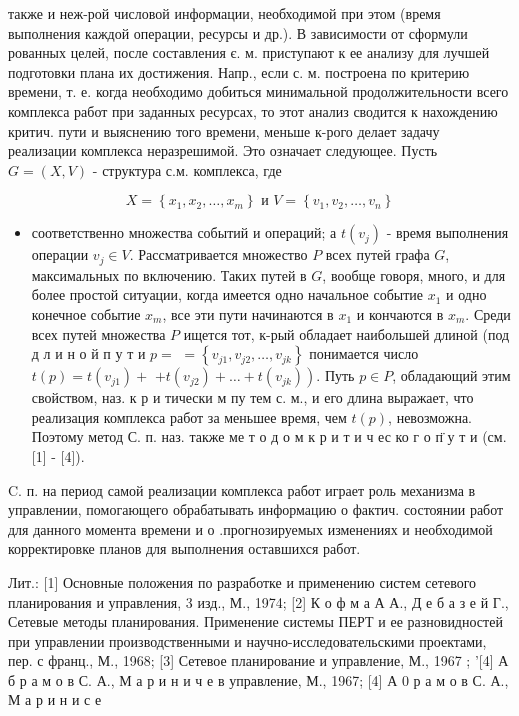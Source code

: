 \documentclass[10pt]{article}
\begin{document}
также и неж-рой числовой информации, необходимой при этом (время выполнения каждой операции, ресурсы и др.). В зависимости от сформули рованных целей, после составления є. м. приступают к ее анализу для лучшей подготовки плана их достижения. Напр., если с. м. построена по критерию времени, т. е. когда необходимо добиться минимальной продолжительности всего комплекса работ при заданных ресурсах, то этот анализ сводится к нахождению критич. пути и выяснению того времени, меньше к-рого делает задачу реализации комплекса неразрешимой. Это означает следующее. Пусть $G=(X, V)$ - структура с.м. комплекса, где



\[

X=\left\{x_{1}, x_{2}, \ldots, x_{m}\right\} \text { и } V=\left\{v_{1}, v_{2}, \ldots, v_{n}\right\}

\]



\begin{itemize}

  \item соответственно множества событий и операций; а $t\left(v_{j}\right)$ - время выполнения операции $v_{j} \in V$. Рассматривается множество $P$ всех путей графа $G$, максимальных по включению. Таких путей в $G$, вообще говоря, много, и для более простой ситуации, когда имеется одно начальное событие $x_{1}$ и одно конечное событие $x_{m}$, все эти пути начинаются в $x_{1}$ и кончаются в $x_{m}$. Среди всех путей множества $P$ ищется тот, к-рый обладает наибольшей длиной (под д л и н о й п у т и $p=$ $=\left\{v_{j 1}, v_{j 2}, \ldots, v_{j k}\right\}$ понимается число $t(p)=t\left(v_{j 1}\right)+$ $\left.+t\left(v_{j 2}\right)+\ldots+t\left(v_{j k}\right)\right)$. Путь $p \in P$, обладающий этим свойством, наз. к р и тически м пу тем с. м., и его длина выражает, что реализация комплекса работ за меньшее время, чем $t(p)$, невозможна. Поэтому метод С. п. наз. также ме т о д о м к р и т и ч ес ко г о п̈ у т и (см. [1] - [4]).

\end{itemize}



C. п. на период самой реализации комплекса работ играет роль механизма в управлении, помогающего обрабатывать информацию о фактич. состоянии работ для данного момента времени и о .прогнозируемых изменениях и необходимой корректировке планов для выполнения оставшихся работ.



Лит.: [1] Основные положения по разработке и применению систем сетевого планирования и управления, 3 изд., М., 1974; [2] К о ф м а А А., Д е б а з е й Г., Сетевые методы планирования. Применение системы ПЕРТ и ее разновидностей при управлении производственными и научно-исследовательскими проектами, пер. с франц., М., 1968; [3] Сетевое планирование и управление, М., 1967 ; '[4] А б р а м о в С. А., М а р и н и ч е в управление, М., 1967; [4] А 0 р а м о в С. А., М а р и н и с е
\end{document}
